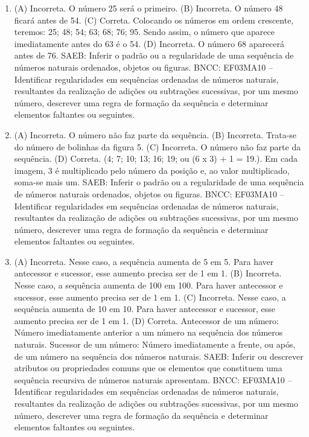 \begin{enumerate}
\item
(A) Incorreta. O número 25 será o primeiro.
(B) Incorreta. O número 48 ficará antes de 54.
(C) Correta. Colocando os números em ordem crescente, teremos: 25; 48; 54; 63; 68; 76; 95. Sendo assim, o número que aparece imediatamente antes do 63 é o 54.
(D) Incorreta. O número 68 aparecerá antes de 76.
SAEB: Inferir o padrão ou a regularidade de uma sequência de números naturais ordenados, objetos ou figuras.
BNCC: EF03MA10 -- Identificar regularidades em sequências ordenadas de números naturais,
resultantes da realização de adições ou subtrações sucessivas, por um mesmo número,
descrever uma regra de formação da sequência e determinar elementos faltantes ou seguintes.

\item
(A) Incorreta. O número não faz parte da sequência.
(B) Incorreta. Trata-se do número de bolinhas da figura 5.
(C) Incorreta. O número não faz parte da sequência.
(D) Correta. (4; 7; 10; 13; 16; 19; ou (6 x 3) + 1 = 19.). Em cada imagem, 3 é multiplicado pelo número da posição e, ao valor multiplicado, soma-se mais um.
SAEB: Inferir o padrão ou a regularidade de uma sequência de números naturais ordenados, objetos ou figuras.
BNCC: EF03MA10 -- Identificar regularidades em sequências ordenadas de números naturais,
resultantes da realização de adições ou subtrações sucessivas, por um mesmo número,
descrever uma regra de formação da sequência e determinar elementos faltantes ou seguintes.

\item
(A) Incorreta. Nesse caso, a sequência aumenta de 5 em 5. Para haver antecessor e sucessor, esse aumento precisa ser de 1 em 1.
(B) Incorreta. Nesse caso, a sequência aumenta de 100 em 100. Para haver antecessor e sucessor, esse aumento precisa ser de 1 em 1.
(C) Incorreta. Nesse caso, a sequência aumenta de 10 em 10. Para haver antecessor e sucessor, esse aumento precisa ser de 1 em 1.
(D) Correta. Antecessor de um número: Número imediatamente anterior a um número na sequência dos números naturais. Sucessor de um número: Número imediatamente a frente, ou após, de um número na sequência dos números naturais.
SAEB: Inferir ou descrever atributos ou propriedades comuns que os elementos que constituem uma sequência recursiva de números naturais apresentam.
BNCC: EF03MA10 -- Identificar regularidades em sequências ordenadas de números naturais,
resultantes da realização de adições ou subtrações sucessivas, por um mesmo número,
descrever uma regra de formação da sequência e determinar elementos faltantes ou seguintes.
\end{enumerate}


